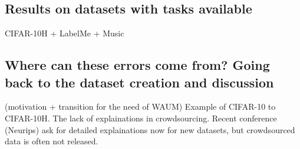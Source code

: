 \subsection{Results on datasets with tasks available}
CIFAR-10H + LabelMe + Music

\subsection{Where can these errors come from? Going back to the dataset creation and discussion}
(motivation + transition for the need of WAUM)
Example of CIFAR-10 to CIFAR-10H. The lack of explainations in crowdsourcing. Recent conference (Neurips) ask for detailed explainations now for new datasets, but crowdsourced data is often not released.
